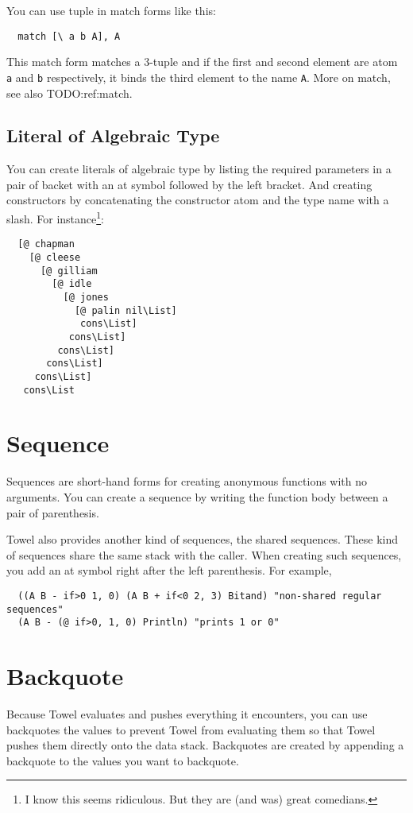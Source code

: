 \documentclass{book}
\begin{document}
You can use tuple in match forms like this:
\begin{verbatim}
  match [\ a b A], A
\end{verbatim}
This match form matches a 3-tuple and if the first and second element are atom \texttt{a} and \texttt{b} respectively, it binds the third element to the name \texttt{A}. More on match, see also TODO:ref:match.

\subsection{Literal of Algebraic Type}

You can create literals of algebraic type by listing the required parameters in a pair of backet with an at symbol followed by the left bracket. And creating constructors by concatenating the constructor atom and the type name with a slash. For instance\footnote{I know this seems ridiculous. But they are (and was) great comedians.}:
\begin{verbatim}
  [@ chapman
    [@ cleese
      [@ gilliam
        [@ idle
          [@ jones
            [@ palin nil\List]
             cons\List]
           cons\List]
         cons\List]
       cons\List]
     cons\List]
   cons\List
\end{verbatim}

\section{Sequence}

Sequences are short-hand forms for creating anonymous functions with no arguments. You can create a sequence by writing the function body between a pair of parenthesis.

Towel also provides another kind of sequences, the shared sequences. These kind of sequences share the same stack with the caller. When creating such sequences, you add an at symbol right after the left parenthesis. For example,
\begin{verbatim}
  ((A B - if>0 1, 0) (A B + if<0 2, 3) Bitand) "non-shared regular sequences"
  (A B - (@ if>0, 1, 0) Println) "prints 1 or 0"
\end{verbatim}

\section{Backquote}

Because Towel evaluates and pushes everything it encounters, you can use backquotes the values to prevent Towel from evaluating them so that Towel pushes them directly onto the data stack. Backquotes are created by appending a backquote to the values you want to backquote.
\end{document}
